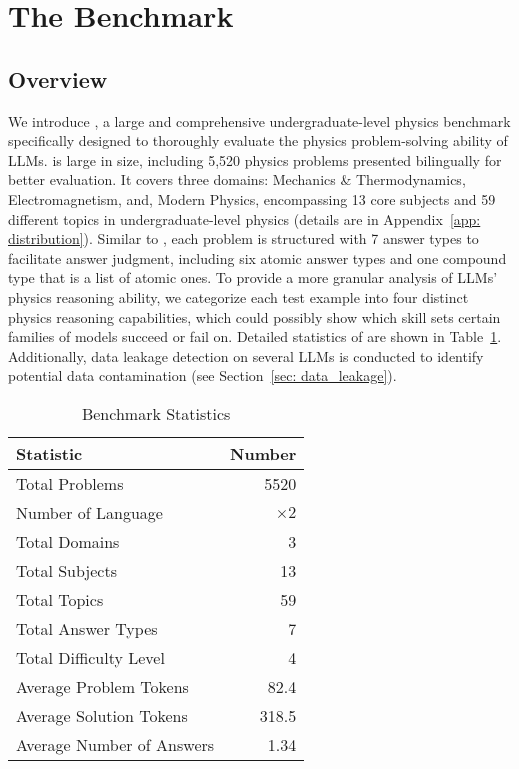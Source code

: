 \section{The {\benchmark} Benchmark}\label{sec: benchmark}

\subsection{{\benchmark} Overview}\label{sec: overview}

We introduce {\benchmark}, a large and comprehensive undergraduate-level physics benchmark specifically designed to thoroughly evaluate the physics problem-solving ability of LLMs.
{\benchmark} is large in size, including 5,520 physics problems presented bilingually for better evaluation.
It covers three domains: Mechanics \& Thermodynamics, Electromagnetism, and, Modern Physics, encompassing 13 core subjects and 59 different topics in undergraduate-level physics (details are in Appendix~\ref{app: distribution}).
Similar to \citet{OlympiadBench2024He, OlympicArena2024huang, ugmathbench2025xu}, each problem is structured with 7 answer types to facilitate answer judgment, including six atomic answer types and one compound type that is a list of atomic ones.
To provide a more granular analysis of LLMs' physics reasoning ability, we categorize each test example into four distinct physics reasoning capabilities, which could possibly show which skill sets certain families of models succeed or fail on.
Detailed statistics of {\benchmark} are shown in Table~\ref{tab:benchmark_statistics}.
Additionally, data leakage detection on several LLMs is conducted to identify potential data contamination (see Section~\ref{sec: data_leakage}).

\begin{table}[t]
    \centering
    \footnotesize
    \caption{Benchmark Statistics}
    \begin{tabular}{l r}
    \toprule
    \textbf{Statistic} & \textbf{Number} \\
    \midrule
    Total Problems & 5520 \\
    Number of Language & $\times 2$ \\
    Total Domains & 3 \\
    Total Subjects & 13 \\
    Total Topics & 59 \\
    Total Answer Types & 7 \\
    Total Difficulty Level & 4 \\
    \midrule
    Average Problem Tokens & 82.4 \\
    Average Solution Tokens & 318.5 \\
    Average Number of Answers & 1.34 \\
    \bottomrule
    \end{tabular}
    \label{tab:benchmark_statistics}
\end{table}




